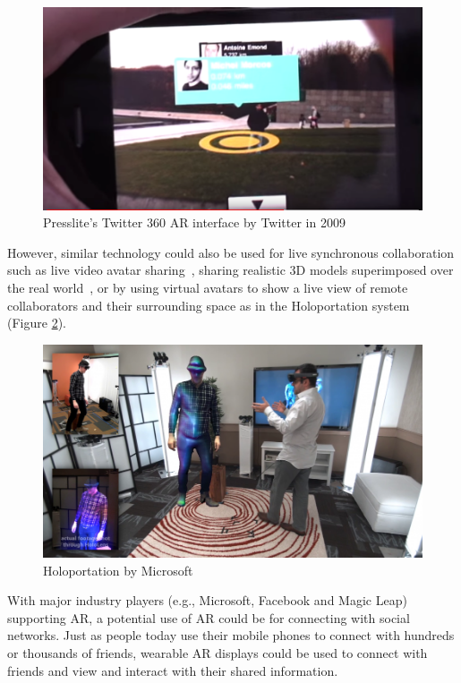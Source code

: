 \begin{figure}
    \centering
    \includegraphics[width=.8\linewidth]{images/Presslite-twitter-360.PNG}
    \caption{Presslite's Twitter 360 AR interface by Twitter in 2009}
    \label{fig:presslite}
\end{figure}

However, similar technology could also be used for live synchronous collaboration such as live video avatar sharing~\cite{Billinghurst2002}, sharing realistic 3D models superimposed over the real world~\cite{Fanello2016}, or by using virtual avatars to show a live view of remote collaborators and their surrounding space as in the Holoportation system~\cite{Fanello2016} (Figure \ref{fig:holoportation}).

\begin{figure}
    \centering
    \includegraphics[width=.8\linewidth]{images/holoportation.png}
    \caption{Holoportation by Microsoft \cite{Fanello2016}}
    \label{fig:holoportation}
\end{figure}


With major industry players (e.g., Microsoft, Facebook and Magic Leap) supporting AR, a potential use of AR could be for connecting with social networks. Just as people today use their mobile phones to connect with hundreds or thousands of friends, wearable AR displays could be used to connect with friends and view and interact with their shared information.

